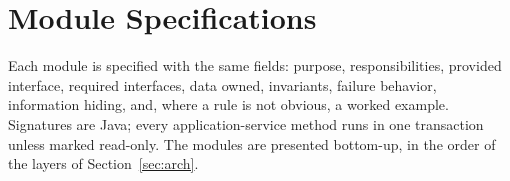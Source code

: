 \documentclass[10pt,letterpaper]{article}
\begin{document}

\newcommand{\sectionbreak}{\clearpage}   %
\setlength{\emergencystretch}{1.5em}




\section{Module Specifications}\label{sec:modules}
Each module is specified with the same fields: purpose, responsibilities, provided interface, required interfaces, data owned, invariants, failure behavior, information hiding, and, where a rule is not obvious, a worked example. Signatures are Java; every application-service method runs in one transaction unless marked read-only. The modules are presented bottom-up, in the order of the layers of Section~\ref{sec:arch}.










\appendix



\end{document}
